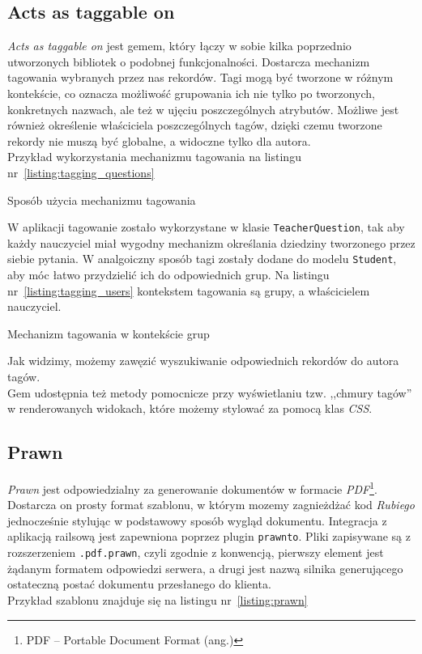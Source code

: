 \documentclass[12pt,twoside]{report}
\begin{document}
\subsection{Acts as taggable on}\label{sec:acts_as_taggable_on}
\emph{Acts as taggable on} jest gemem, który łączy w sobie kilka poprzednio utworzonych
bibliotek o podobnej funkcjonalności. Dostarcza mechanizm tagowania wybranych przez
nas rekordów. Tagi mogą być tworzone w różnym kontekście, co oznacza możliwość grupowania
ich nie tylko po tworzonych, konkretnych nazwach, ale też w ujęciu poszczególnych
atrybutów. Możliwe jest również określenie właściciela poszczególnych tagów, dzięki czemu
tworzone rekordy nie muszą być globalne, a widoczne tylko dla autora.\\
Przykład wykorzystania mechanizmu tagowania na listingu nr~\ref{listing:tagging_questions}

\begin{listing}
  
  \caption{Sposób użycia mechanizmu tagowania}
  \label{listing:tagging_questions}
\end{listing}


W aplikacji tagowanie zostało wykorzystane w klasie \texttt{TeacherQuestion}, tak aby
każdy nauczyciel miał wygodny mechanizm określania dziedziny tworzonego przez siebie
pytania. W analgoiczny sposób tagi zostały dodane do modelu \texttt{Student}, aby móc
łatwo przydzielić ich do odpowiednich grup. Na listingu nr~\ref{listing:tagging_users}
kontekstem tagowania są grupy, a właścicielem nauczyciel.

\begin{listing}
  
  \caption{Mechanizm tagowania w kontekście grup}
  \label{listing:tagging_users}
\end{listing}


Jak widzimy, możemy zawęzić wyszukiwanie odpowiednich rekordów do autora tagów.\\
Gem udostępnia też metody pomocnicze przy wyświetlaniu tzw. ,,chmury tagów'' w
renderowanych widokach, które możemy stylować za pomocą klas \emph{CSS}.

\subsection{Prawn}
\emph{Prawn} jest odpowiedzialny za generowanie dokumentów w formacie
\emph{PDF}\footnote{PDF -- Portable Document Format (ang.)}. Dostarcza on prosty format
szablonu, w którym mozemy zagnieżdżać kod \emph{Rubiego} jednocześnie stylując
w podstawowy sposób wygląd dokumentu. Integracja z aplikacją railsową jest zapewniona
poprzez plugin \texttt{prawnto}. Pliki zapisywane są z rozszerzeniem \texttt{.pdf.prawn},
czyli zgodnie z konwencją, pierwszy element jest żądanym formatem odpowiedzi serwera,
a drugi jest nazwą silnika generującego ostateczną postać dokumentu przesłanego do klienta.\\
Przykład szablonu znajduje się na listingu nr~\ref{listing:prawn}
\end{document}
